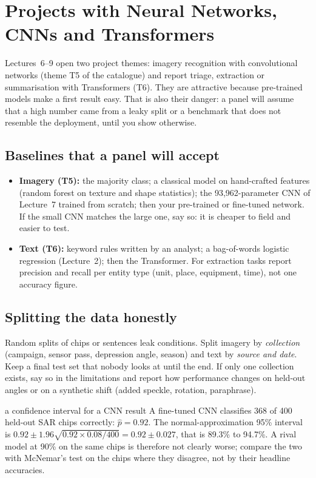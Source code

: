 \documentclass[11pt]{article}
\begin{document}
\section{Projects with Neural Networks, CNNs and Transformers}
Lectures~6--9 open two project themes: imagery recognition with convolutional networks (theme T5 of the catalogue) and report triage, extraction or summarisation with Transformers (T6). They are attractive because pre-trained models make a first result easy. That is also their danger: a panel will assume that a high number came from a leaky split or a benchmark that does not resemble the deployment, until you show otherwise.

\subsection{Baselines that a panel will accept}
\begin{itemize}
\item \textbf{Imagery (T5):} the majority class; a classical model on hand-crafted features (random forest on texture and shape statistics); the 93,962-parameter CNN of Lecture~7 trained from scratch; then your pre-trained or fine-tuned network. If the small CNN matches the large one, say so: it is cheaper to field and easier to test.
\item \textbf{Text (T6):} keyword rules written by an analyst; a bag-of-words logistic regression (Lecture~2); then the Transformer. For extraction tasks report precision and recall per entity type (unit, place, equipment, time), not one accuracy figure.
\end{itemize}

\subsection{Splitting the data honestly}
Random splits of chips or sentences leak conditions. Split imagery by \emph{collection} (campaign, sensor pass, depression angle, season) and text by \emph{source and date}. Keep a final test set that nobody looks at until the end. If only one collection exists, say so in the limitations and report how performance changes on held-out angles or on a synthetic shift (added speckle, rotation, paraphrase).

\begin{example}{a confidence interval for a CNN result}
A fine-tuned CNN classifies 368 of 400 held-out SAR chips correctly: $\hat p=0.92$. The normal-approximation 95\% interval is $0.92\pm1.96\sqrt{0.92\times0.08/400}=0.92\pm0.027$, that is 89.3\% to 94.7\%. A rival model at 90\% on the same chips is therefore not clearly worse; compare the two with McNemar's test on the chips where they disagree, not by their headline accuracies.
\end{example}
\end{document}
